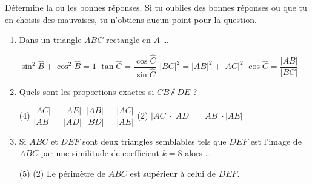 %
%
    Détermine la ou les bonnes réponses. Si tu oublies des bonnes réponses ou que tu en choisis des mauvaises, tu n'obtiens aucun point pour la question.
    \begin{enumerate}
        \item Dans un triangle $ABC$ rectangle en $A$ \dots
              \begin{QCM}
                  \choice $\sin^2\widehat{B} + \cos^2\widehat{B}=1$
                  \choice $\tan\widehat{C} = \dfrac{\cos\widehat{C}}{\sin\widehat{C}}$
                  \choice $|BC|^2 = |AB|^2 + |AC|^2$
                  \choice $\cos\widehat{C}=\dfrac{|AB|}{|BC|}$
              \end{QCM}
        \item Quels sont les proportions exactes si $CB\sslash DE$ ? 
              \begin{QCM}(4)
                  \choice $\dfrac{|AC|}{|AB|}=\dfrac{|AE|}{|AD|}$
                  \choice $\dfrac{|AB|}{|BD|}=\dfrac{|AC|}{|AE|}$
                  \choice*(2) $|AC|\cdot |AD| = |AB| \cdot |AE|$
              \end{QCM}
        \item Si $ABC$ et $DEF$ sont deux triangles semblables tels que $DEF$ est l'image de $ABC$ par une similitude de coefficient $k=8$ alors \dots
              \begin{QCM}(5)
                  \choice*(2) Le périmètre de $ABC$ est supérieur à celui de $DEF$.

\end{QCM}
\end{enumerate}
